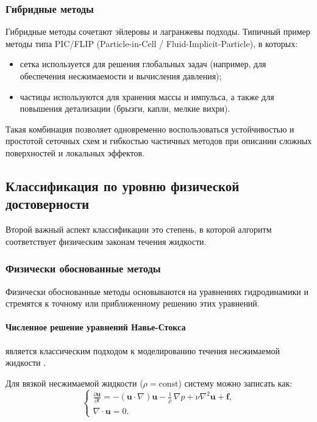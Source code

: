 \subsubsection{Гибридные методы}

Гибридные методы сочетают эйлеровы и лагранжевы подходы.
Типичный пример \textemdash{} методы типа PIC/FLIP (Particle-in-Cell / Fluid-Implicit-Particle),
в которых:
\begin{itemize}
  \item сетка используется для решения глобальных задач (например, для обеспечения
        несжимаемости и вычисления давления);
  \item частицы используются для хранения массы и импульса, а также для
        повышения детализации (брызги, капли, мелкие вихри).
\end{itemize}

Такая комбинация позволяет одновременно воспользоваться устойчивостью и
простотой сеточных схем и гибкостью частичных методов при описании сложных
поверхностей и локальных эффектов.

\subsection{Классификация по уровню физической достоверности}

Второй важный аспект классификации \textemdash{} это степень, в которой алгоритм
соответствует физическим законам течения жидкости.

\subsubsection{Физически обоснованные методы}

Физически обоснованные методы основываются на уравнениях гидродинамики
и стремятся к точному или приближенному решению этих уравнений.

\paragraph{Численное решение уравнений Навье-Стокса} является классическим
подходом к моделированию течения несжимаемой жидкости \cite{holybook}.

Для вязкой несжимаемой жидкости
(\(\rho = \mathrm{const}\)) систему можно записать как:
\begin{equation}
  \begin{cases}
    \displaystyle
    \frac{\partial \mathbf{u}}{\partial t}
    =
    - (\mathbf{u}\cdot\nabla)\mathbf{u}
    -\frac{1}{\rho}\,\nabla p
    + \nu\nabla^{2}\mathbf{u}
    + \mathbf{f}, \\[6pt]
    \displaystyle
    \nabla\cdot\mathbf{u} = 0.
  \end{cases}
  \label{eq:NS}
\end{equation}

